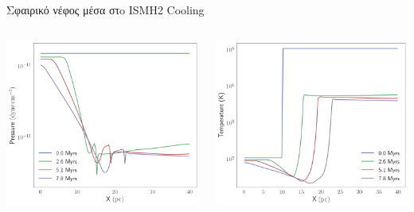 \documentclass{beamer}
\begin{document}
\begin{frame}{Σφαιρικό νέφος μέσα στo ISM}{Η2 Cooling}
	\begin{columns}
		
		\begin{center}
			\includegraphics[width=1\linewidth]{../Document/DataImages/H2CoolingPRSprofile}
		\end{center}
\begin{center}
	\includegraphics[width=1\linewidth]{../Document/DataImages/H2CoolingTMPprofile}
\end{center}
	\end{columns}
\end{frame}
\end{document}

